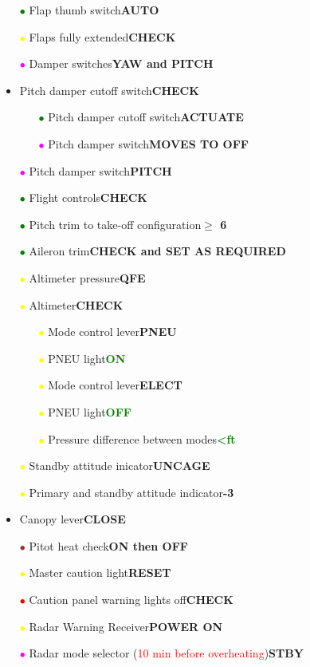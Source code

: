 \documentclass[a4paper,12pt,dvipsnames]{letter}
\newcommand{\rot}[1]{\textcolor{red}{#1}}
\newcommand{\button}[1]{\textbf{#1}}
\newcommand{\ok}[1]{\textcolor{Green}{\textbf{#1}}}
\newcommand{\ri}{\textcolor{Red}{$\bullet$\;}}
\newcommand{\gi}{\textcolor{Green}{$\bullet$\;}}
\newcommand{\yi}{\textcolor{Yellow}{$\bullet$\;}}
\newcommand{\mi}{\textcolor{Magenta}{$\bullet$\;}}
\renewcommand{\ni}{\textcolor{Brown}{$\bullet$\;}}
\begin{document}
{\begin{itemize}
 \item[\gi] Flap thumb switch\dotfill\button{AUTO}
 \item[\yi] Flaps fully extended\dotfill\button{CHECK}
 \item[\mi] Damper switches\dotfill\button{YAW and PITCH}
 \item Pitch damper cutoff switch\dotfill\button{CHECK}
 \begin{itemize}
  \item[\gi] Pitch damper cutoff switch\dotfill\button{ACTUATE}
  \item[\mi] Pitch damper switch\dotfill\button{MOVES TO OFF}  
 \end{itemize}
 \item[\mi] Pitch damper switch\dotfill\button{PITCH}
 \item[\gi] Flight controls\dotfill\button{CHECK}
 \item[\gi] Pitch trim to take-off configuration\dotfill\button{$\ge$ 6}
 \item[\gi] Aileron trim\dotfill\button{CHECK and SET AS REQUIRED}
 \item[\yi] Altimeter pressure\dotfill\button{QFE}
 \item[\yi] Altimeter\dotfill\button{CHECK}
 \begin{itemize}
 \item[\yi] Mode control lever\dotfill\button{PNEU}
 \item[\yi] PNEU light\dotfill\ok{ON}
 \item[\yi] Mode control lever\dotfill\button{ELECT}
 \item[\yi] PNEU light\dotfill\ok{OFF}
 \item[\yi] Pressure difference between modes\dotfill\ok{<\;ft}
 \end{itemize}
 \item[\yi] Standby attitude inicator\dotfill\button{UNCAGE}
 \item[\yi] Primary and standby attitude indicator\dotfill\button{-3\textdegree{}}
 \item Canopy lever\dotfill\button{CLOSE}
 \item[\ni] Pitot heat check\dotfill\button{ON then OFF}
 \item[\yi] Master caution light\dotfill\button{RESET}
 \item[\ri] Caution panel warning lights off\dotfill\button{CHECK}
 \item[\yi] Radar Warning Receiver\dotfill\button{POWER ON}
 \item[\mi] Radar mode selector (\rot{10 min before overheating})\dotfill\button{STBY}

\end{itemize}}
\end{document}
